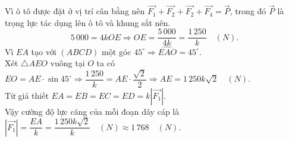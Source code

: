 \begin{ex}
{$$        $$
        Vì ô tô được đặt ở vị trí cân bằng nên $\overrightarrow{F_1}+\overrightarrow{F_2}+\overrightarrow{F_2}+\overrightarrow{F_4}=\overrightarrow{P}$, trong đó $\overrightarrow{P}$ là trọng lực tác dụng lên ô tô và khung sắt nên.
        $$5\,000=4kOE\Rightarrow OE=\dfrac{5\,000}{4k}=\dfrac{1\,250}{k} \quad(N).
        $$
        Vì $EA$ tạo với $\left(ABCD\right)$ một góc $45^\circ\Rightarrow \widehat{EAO}=45^\circ$.\\
        Xét $\triangle AEO$ vuông tại $O$ ta có $EO=AE\cdot\sin 45^\circ\Rightarrow \dfrac{1\,250}{k}=AE\cdot\dfrac{\sqrt{2}}{2} \Rightarrow AE=1\,250k\sqrt{2} \quad(N)$.\\
        Từ giả thiết $EA=EB=EC=ED=k\left|\overrightarrow{F_1}\right|$.\\
        Vậy cường độ lực căng của mỗi đoạn dây cáp là$\left|\overrightarrow{F_1}\right|=\dfrac{EA}{k}=\dfrac{1\,250k\sqrt{2}}{k}\quad (N)\approx 1\,768\quad(N)$.
    }
\end{ex}

